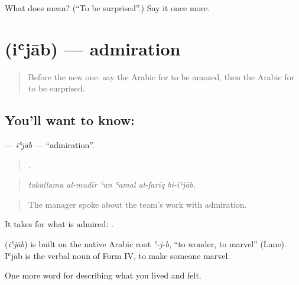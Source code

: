 \begin{tcolorbox}[breakable,colback=teal!4,colframe=teal!35!black,title={Before you move on}]
What does  mean? (\textquotedblleft{}To be surprised\textquotedblright{}.) Say it once more.
\end{tcolorbox}
\section[\texorpdfstring{\ar{إعجاب} (iʿjāb)}{إعجاب (iʿjāb)}]{ (iʿjāb) — admiration}

\label{lesson:AR-C490-ijab}



\begin{quote}
Before the new one: say the Arabic for to be amazed, then the Arabic for to be surprised.
\end{quote}

\subsection*{You'll want to know: }
\textbf{} — \emph{iʿjāb} — \textquotedblleft{}admiration\textquotedblright{}.

\begin{quote}
     .
\end{quote}

\begin{quote}
\emph{takallama al-mudīr ʿan ʿamal al-farīq bi-iʿjāb.}
\end{quote}

\begin{quote}
The manager spoke about the team's work with admiration.
\end{quote}

It takes  for what is admired:  .

\begin{cousinweb}
\textbf{} (\emph{iʿjāb}) is built on the native Arabic root \emph{ʿ-j-b}, \textquotedblleft{}to wonder, to marvel\textquotedblright{} (Lane). Iʿjāb is the verbal noun of Form IV, to make someone marvel.
\end{cousinweb}

\begin{grammarlens}[title={What you've built}]
One more word for describing what you lived and felt.
\end{grammarlens}


